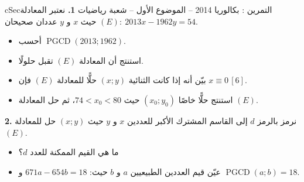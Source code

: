 \documentclass[12pt,a4paper]{article}
\newenvironment{BOX}[2]{\begin{otherlanguage}{english}\begin{arbox}{#1}{#2}}{\end{arbox}\end{otherlanguage}}
\newcounter{exo}
\newenvironment{tamrin}[1]{\stepcounter{exo}\begin{BOX}{cSec}{التمرين \theexo: #1}}{\end{BOX}}
\newcommand{\pgcd}{\operatorname{PGCD}}
\newenvironment{sq}{\begin{itemize}[leftmargin=2.4em,itemsep=3pt]}{\end{itemize}}
\newcommand{\qa}{\item[(أ)]}\newcommand{\qb}{\item[(ب)]}\newcommand{\qc}{\item[(جـ)]}\newcommand{\qd}{\item[(د)]}\newcommand{\qe}{\item[(هـ)]}
\begin{document}
\begin{tamrin}{بكالوريا 2014 -- الموضوع الأول -- شعبة رياضيات}
\textbf{1.} نعتبر المعادلة $(E):\ 2013x-1962y=54$ حيث $x$ و $y$ عددان صحيحان.
\begin{sq}
\qa أحسب $\pgcd(2013;1962)$.
\qb استنتج أن المعادلة $(E)$ تقبل حلولًا.
\qc بيّن أنه إذا كانت الثنائية $(x;y)$ حلًّا للمعادلة $(E)$ فإن $x\equiv0\,[6]$.
\qd استنتج حلًّا خاصًا $(x_0;y_0)$ حيث $74<x_0<80$، ثم حل المعادلة $(E)$.
\end{sq}
\textbf{2.} نرمز بالرمز $d$ إلى القاسم المشترك الأكبر للعددين $x$ و $y$ حيث $(x;y)$ حل للمعادلة $(E)$.
\begin{sq}
\qa ما هي القيم الممكنة للعدد $d$؟
\qb عيّن قيم العددين الطبيعيين $a$ و $b$ حيث: $671a-654b=18$ و $\pgcd(a;b)=18$.
\end{sq}
\end{tamrin}
\end{document}
